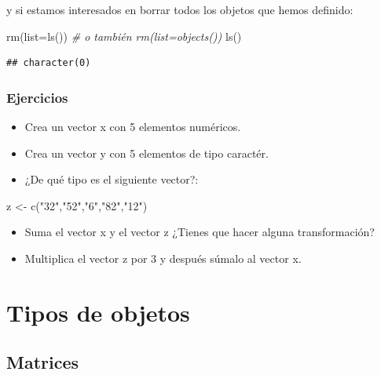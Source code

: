 \documentclass[
]{book}
\newenvironment{Shaded}{\begin{snugshade}}{\end{snugshade}}
\newcommand{\AttributeTok}[1]{\textcolor[rgb]{0.77,0.63,0.00}{#1}}
\newcommand{\CommentTok}[1]{\textcolor[rgb]{0.56,0.35,0.01}{\textit{#1}}}
\newcommand{\FunctionTok}[1]{\textcolor[rgb]{0.00,0.00,0.00}{#1}}
\newcommand{\NormalTok}[1]{#1}
\newcommand{\OtherTok}[1]{\textcolor[rgb]{0.56,0.35,0.01}{#1}}
\newcommand{\StringTok}[1]{\textcolor[rgb]{0.31,0.60,0.02}{#1}}
\providecommand{\tightlist}{%
  \setlength{\itemsep}{0pt}\setlength{\parskip}{0pt}}
\begin{document}
y si estamos interesados en borrar todos los objetos que hemos definido:

\begin{Shaded}
\begin{Highlighting}[]
\FunctionTok{rm}\NormalTok{(}\AttributeTok{list=}\FunctionTok{ls}\NormalTok{()) }\CommentTok{\# o también rm(list=objects())}
\FunctionTok{ls}\NormalTok{()}
\end{Highlighting}
\end{Shaded}

\begin{verbatim}
## character(0)
\end{verbatim}

\hypertarget{ejercicios}{%
\subsubsection{Ejercicios}\label{ejercicios}}

\begin{itemize}
\tightlist
\item
  Crea un vector x con 5 elementos numéricos.
\item
  Crea un vector y con 5 elementos de tipo caractér.
\item
  ¿De qué tipo es el siguiente vector?:
\end{itemize}

\begin{Shaded}
\begin{Highlighting}[]
\NormalTok{z }\OtherTok{\textless{}{-}} \FunctionTok{c}\NormalTok{(}\StringTok{"32"}\NormalTok{,}\StringTok{"52"}\NormalTok{,}\StringTok{"6"}\NormalTok{,}\StringTok{"82"}\NormalTok{,}\StringTok{"12"}\NormalTok{)}
\end{Highlighting}
\end{Shaded}

\begin{itemize}
\tightlist
\item
  Suma el vector x y el vector z ¿Tienes que hacer alguna transformación?
\item
  Multiplica el vector z por 3 y después súmalo al vector x.
\end{itemize}

\hypertarget{tipos-de-objetos}{%
\section{Tipos de objetos}\label{tipos-de-objetos}}

\hypertarget{matrices}{%
\subsection{Matrices}\label{matrices}}
\end{document}
